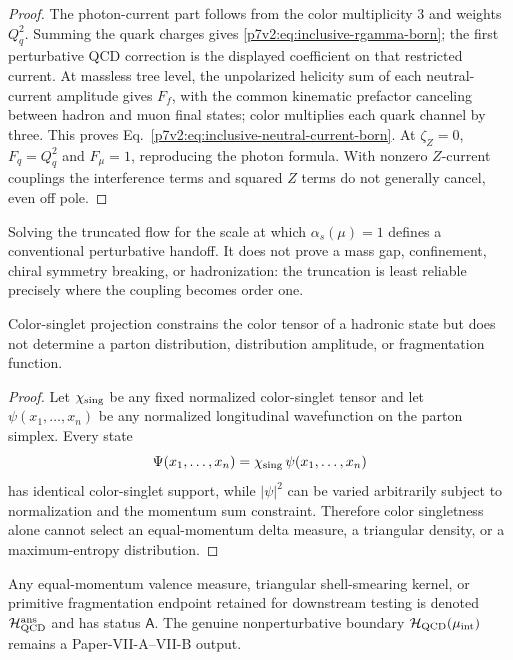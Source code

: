 \documentclass[12pt,a4paper]{article}
\begin{document}
\begin{proof}
The photon-current part follows from the color multiplicity \(3\) and
weights \(Q_q^2\). Summing the quark charges gives
\eqref{p7v2:eq:inclusive-rgamma-born}; the first perturbative QCD
correction is the displayed coefficient on that restricted current.
At massless tree level, the unpolarized helicity sum of each neutral-current
amplitude gives \(F_f\), with the common kinematic prefactor canceling
between hadron and muon final states; color multiplies each quark channel
by three. This proves Eq.~\eqref{p7v2:eq:inclusive-neutral-current-born}.
At \(\zeta_Z=0\), \(F_q=Q_q^2\) and \(F_\mu=1\), reproducing the
photon formula. With nonzero \(Z\)-current couplings the interference
terms and squared \(Z\) terms do not generally cancel, even off pole.
\end{proof}

\begin{remark}
Solving the truncated flow for the scale at which
\(\alpha_s(\mu)=1\) defines a conventional perturbative handoff.  It does not
prove a mass gap, confinement, chiral symmetry breaking, or hadronization:
the truncation is least reliable precisely where the coupling becomes order
one.
\end{remark}

\begin{proposition}
\label{p7v2:prop:singlet-not-pdf}
Color-singlet projection constrains the color tensor of a hadronic state but
does not determine a parton distribution, distribution amplitude, or
fragmentation function.
\end{proposition}

\begin{proof}
Let \(\chi_{\rm sing}\) be any fixed normalized color-singlet tensor and let
\(\psi(x_1,\ldots,x_n)\) be any normalized longitudinal wavefunction on the
parton simplex.  Every state
\[
 \Psi(x_1,\ldots,x_n)
 =
 \chi_{\rm sing}\,\psi(x_1,\ldots,x_n)
\]
has identical color-singlet support, while \(|\psi|^2\) can be varied
arbitrarily subject to normalization and the momentum sum constraint.
Therefore color singletness alone cannot select an equal-momentum delta
measure, a triangular density, or a maximum-entropy distribution.
\end{proof}

\begin{definition}
\label{p7v2:def:qcd-boundary-ansatz}
Any equal-momentum valence measure, triangular shell-smearing kernel, or
primitive fragmentation endpoint retained for downstream testing is denoted
\(\mathcal H_{\rm QCD}^{\rm ans}\) and has status \(\mathsf A\).  The genuine
nonperturbative boundary
\(\mathcal H_{\rm QCD}(\mu_{\rm int})\) remains a Paper-VII-A--VII-B output.
\end{definition}
\end{document}
